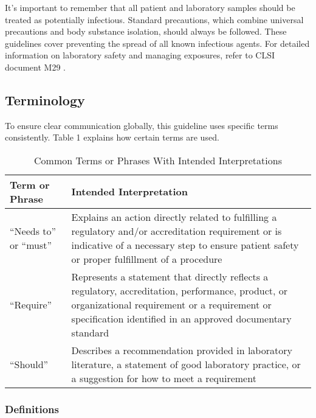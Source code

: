 \documentclass{article}
\begin{document}
It's important to remember that all patient and laboratory samples should be treated as potentially infectious. Standard precautions, which combine universal precautions and body substance isolation, should always be followed. These guidelines cover preventing the spread of all known infectious agents. For detailed information on laboratory safety and managing exposures, refer to CLSI document M29 \cite{CLSIM29}.

\subsection{Terminology}

To ensure clear communication globally, this guideline uses specific terms consistently. Table 1 explains how certain terms are used.

\begin{table}[h!]
\centering
\caption{Common Terms or Phrases With Intended Interpretations \cite{CLSIEP39Ed1E}}
\begin{tabular}{>{\raggedright\arraybackslash}p{4cm} >{\raggedright\arraybackslash}p{9cm}}
\toprule
\textbf{Term or Phrase} & \textbf{Intended Interpretation} \\
\midrule
“Needs to” or “must” & Explains an action directly related to fulfilling a regulatory and/or accreditation requirement or is indicative of a necessary step to ensure patient safety or proper fulfillment of a procedure \\
“Require” & Represents a statement that directly reflects a regulatory, accreditation, performance, product, or organizational requirement or a requirement or specification identified in an approved documentary standard \\
“Should” & Describes a recommendation provided in laboratory literature, a statement of good laboratory practice, or a suggestion for how to meet a requirement \\
\bottomrule
\end{tabular}
\end{table}

\subsubsection{Definitions}
\end{document}
